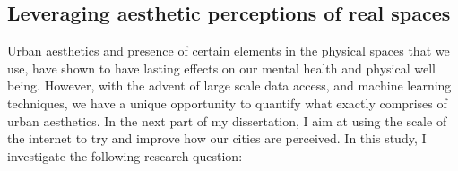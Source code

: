 \subsection{Leveraging aesthetic perceptions of real spaces}
Urban aesthetics and presence of certain elements in the physical spaces that we use, have shown to have lasting effects on our mental health\cite{seresinhe2017using} and physical well being\cite{ball2001perceived,giles2005increasing}. However, with the advent of large scale data access, and machine learning techniques, we have a unique opportunity to quantify what exactly comprises of urban aesthetics.
In the next part of my dissertation, I aim at using the scale of the internet to try and improve how our cities are perceived. In this study, I investigate the following research question: 
\noindent{}

\noindent{}

\noindent{}
\vspace{1cm}

